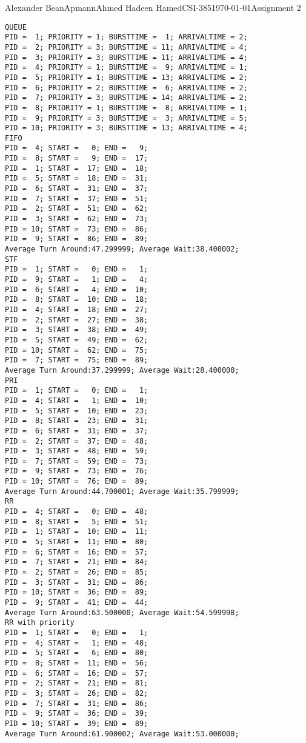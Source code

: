 \documentclass[12pt,letterpaper]{article}
\begin{document}
\begin{mla}{Alexander Bean}{Apmann}{Ahmed Hadeen Hamed}{CSI-385}{\today}{Assignment 2}
\begin{lstlisting}[frame=single]
QUEUE
PID =  1; PRIORITY = 1; BURSTTIME =  1; ARRIVALTIME = 2;
PID =  2; PRIORITY = 3; BURSTTIME = 11; ARRIVALTIME = 4;
PID =  3; PRIORITY = 3; BURSTTIME = 11; ARRIVALTIME = 4;
PID =  4; PRIORITY = 1; BURSTTIME =  9; ARRIVALTIME = 1;
PID =  5; PRIORITY = 1; BURSTTIME = 13; ARRIVALTIME = 2;
PID =  6; PRIORITY = 2; BURSTTIME =  6; ARRIVALTIME = 2;
PID =  7; PRIORITY = 3; BURSTTIME = 14; ARRIVALTIME = 2;
PID =  8; PRIORITY = 1; BURSTTIME =  8; ARRIVALTIME = 1;
PID =  9; PRIORITY = 3; BURSTTIME =  3; ARRIVALTIME = 5;
PID = 10; PRIORITY = 3; BURSTTIME = 13; ARRIVALTIME = 4;
FIFO
PID =  4; START =   0; END =   9;
PID =  8; START =   9; END =  17;
PID =  1; START =  17; END =  18;
PID =  5; START =  18; END =  31;
PID =  6; START =  31; END =  37;
PID =  7; START =  37; END =  51;
PID =  2; START =  51; END =  62;
PID =  3; START =  62; END =  73;
PID = 10; START =  73; END =  86;
PID =  9; START =  86; END =  89;
Average Turn Around:47.299999; Average Wait:38.400002;
STF
PID =  1; START =   0; END =   1;
PID =  9; START =   1; END =   4;
PID =  6; START =   4; END =  10;
PID =  8; START =  10; END =  18;
PID =  4; START =  18; END =  27;
PID =  2; START =  27; END =  38;
PID =  3; START =  38; END =  49;
PID =  5; START =  49; END =  62;
PID = 10; START =  62; END =  75;
PID =  7; START =  75; END =  89;
Average Turn Around:37.299999; Average Wait:28.400000;
PRI
PID =  1; START =   0; END =   1;
PID =  4; START =   1; END =  10;
PID =  5; START =  10; END =  23;
PID =  8; START =  23; END =  31;
PID =  6; START =  31; END =  37;
PID =  2; START =  37; END =  48;
PID =  3; START =  48; END =  59;
PID =  7; START =  59; END =  73;
PID =  9; START =  73; END =  76;
PID = 10; START =  76; END =  89;
Average Turn Around:44.700001; Average Wait:35.799999;
RR
PID =  4; START =   0; END =  48;
PID =  8; START =   5; END =  51;
PID =  1; START =  10; END =  11;
PID =  5; START =  11; END =  80;
PID =  6; START =  16; END =  57;
PID =  7; START =  21; END =  84;
PID =  2; START =  26; END =  85;
PID =  3; START =  31; END =  86;
PID = 10; START =  36; END =  89;
PID =  9; START =  41; END =  44;
Average Turn Around:63.500000; Average Wait:54.599998;
RR with priority
PID =  1; START =   0; END =   1;
PID =  4; START =   1; END =  48;
PID =  5; START =   6; END =  80;
PID =  8; START =  11; END =  56;
PID =  6; START =  16; END =  57;
PID =  2; START =  21; END =  81;
PID =  3; START =  26; END =  82;
PID =  7; START =  31; END =  86;
PID =  9; START =  36; END =  39;
PID = 10; START =  39; END =  89;
Average Turn Around:61.900002; Average Wait:53.000000;
\end{lstlisting}


\end{mla}
\end{document}
